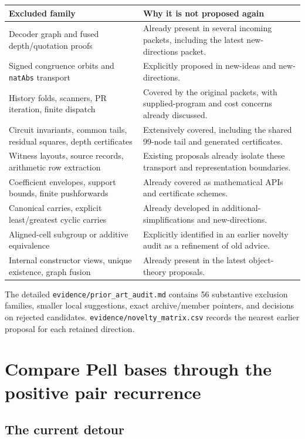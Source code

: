 \documentclass[11pt,a4paper]{article}
\newcommand{\code}[1]{\nolinkurl{#1}}
\begin{document}
\begin{tabularx}{\textwidth}{@{}P{42mm}Y@{}}
\toprule
Excluded family & Why it is not proposed again\\
\midrule
Decoder graph and fused depth/quotation proofs & Already present in several incoming packets, including the latest new-directions packet.\\
Signed congruence orbits and \code{natAbs} transport & Explicitly proposed in new-ideas and new-directions.\\
History folds, scanners, PR iteration, finite dispatch & Covered by the original packets, with supplied-program and cost concerns already discussed.\\
Circuit invariants, common tails, residual squares, depth certificates & Extensively covered, including the shared 99-node tail and generated certificates.\\
Witness layouts, source records, arithmetic row extraction & Existing proposals already isolate these transport and representation boundaries.\\
Coefficient envelopes, support bounds, finite pushforwards & Already covered as mathematical APIs and certificate schemes.\\
Canonical carries, explicit least/greatest cyclic carries & Already developed in additional-simplifications and new-directions.\\
Aligned-cell subgroup or additive equivalence & Explicitly identified in an earlier novelty audit as a refinement of old advice.\\
Internal constructor views, unique existence, graph fusion & Already present in the latest object-theory proposals.\\
\bottomrule
\end{tabularx}

The detailed \code{evidence/prior_art_audit.md} contains 56 substantive
exclusion families, smaller local suggestions, exact archive/member pointers,
and decisions on rejected candidates. \code{evidence/novelty_matrix.csv}
records the nearest earlier proposal for each retained direction.

\section{Compare Pell bases through the positive pair recurrence}
\label{sec:pell}

\subsection{The current detour}
\end{document}
